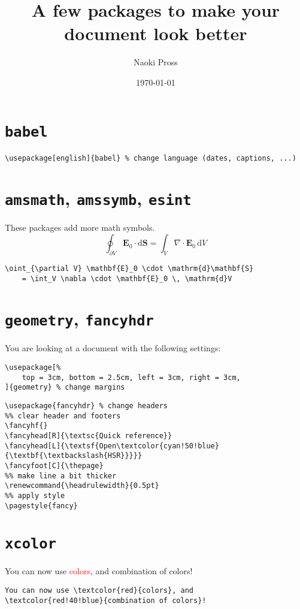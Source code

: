 \documentclass[a4paper]{article}
\title{A few packages to make your document look better}
\author{Naoki Pross}
\date{\today}
\renewcommand{\headrulewidth}{0.5pt}
\begin{document}
\maketitle

\section{\texttt{babel}}
\begin{lstlisting}
\usepackage[english]{babel} % change language (dates, captions, ...)
\end{lstlisting}


\section{\texttt{amsmath}, \texttt{amssymb}, \texttt{esint}}
These packages add more math symbols.
\[
    \oint_{\partial V} \mathbf{E}_0 \cdot \mathrm{d}\mathbf{S} 
	= \int_V \nabla \cdot \mathbf{E}_0 \, \mathrm{d}V
\]
\begin{lstlisting}
\oint_{\partial V} \mathbf{E}_0 \cdot \mathrm{d}\mathbf{S} 
    = \int_V \nabla \cdot \mathbf{E}_0 \, \mathrm{d}V
\end{lstlisting}


\section{\texttt{geometry}, \texttt{fancyhdr}}
You are looking at a document with the following settings:
\begin{lstlisting}
\usepackage[%
    top = 3cm, bottom = 2.5cm, left = 3cm, right = 3cm,
]{geometry} % change margins
\end{lstlisting}

\begin{lstlisting}
\usepackage{fancyhdr} % change headers
%% clear header and footers
\fancyhf{}
\fancyhead[R]{\textsc{Quick reference}}
\fancyhead[L]{\textsf{Open\textcolor{cyan!50!blue}{\textbf{\textbackslash{HSR}}}}}
\fancyfoot[C]{\thepage}
%% make line a bit thicker
\renewcommand{\headrulewidth}{0.5pt}
%% apply style
\pagestyle{fancy}
\end{lstlisting}


\section{\texttt{xcolor}}
You can now use \textcolor{red}{colors}, and 
\textcolor{red!40!blue}{combination of colors}!

\begin{lstlisting}
You can now use \textcolor{red}{colors}, and 
\textcolor{red!40!blue}{combination of colors}!
\end{lstlisting}
\end{document}
